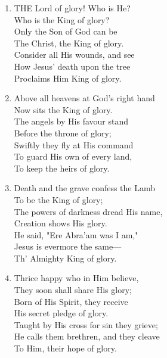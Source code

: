 \begin{enumerate}
    \item THE Lord of glory! Who is He? \\
        Who is the King of glory? \\
        Only the Son of God can be \\
        The Christ, the King of glory. \\
        Consider all His wounds, and see \\
        How Jesus' death upon the tree \\
        Proclaims Him King of glory.

    \item Above all heavens at God's right hand \\
        Now sits the King of glory. \\
        The angels by His favour stand \\
        Before the throne of glory; \\
        Swiftly they fly at His command \\
        To guard His own of every land, \\
        To keep the heirs of glory.

    \item Death and the grave confess the Lamb \\
        To be the King of glory; \\
        The powers of darkness dread His name, \\
        Creation shows His glory. \\
        He said, "Ere Abra'am was I am," \\
        Jesus is evermore the same--- \\
        Th' Almighty King of glory.

    \item Thrice happy who in Him believe, \\
        They soon shall share His glory; \\
        Born of His Spirit, they receive \\
        His secret pledge of glory. \\
        Taught by His cross for sin they grieve; \\
        He calls them brethren, and they cleave \\
        To Him, their hope of glory.

\end{enumerate}

